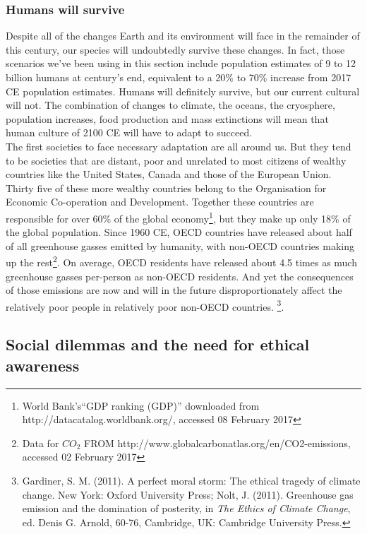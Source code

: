 \subsubsection{Humans will survive}
Despite all of the changes Earth and its environment will face in the remainder of this century, our species will undoubtedly survive these changes. In fact, those scenarios we've been using in this section include population estimates of 9 to 12 billion humans at century's end, equivalent to a 20\% to 70\% increase from 2017 CE population estimates. Humans will definitely survive, but our current cultural will not. The combination of changes to climate, the oceans, the cryosphere, population increases, food production and mass extinctions will mean that human culture of 2100 CE will have to adapt to succeed.\\

The first societies to face necessary adaptation are all around us. But they tend to be societies that are distant, poor and unrelated to most citizens of wealthy countries like the United States, Canada and those of the European Union. Thirty five of these more wealthy countries belong to the Organisation for Economic Co-operation and Development. Together these countries are responsible for over 60\% of the global economy\footnote{World Bank's``GDP ranking (GDP)'' downloaded from http://datacatalog.worldbank.org/, accessed 08 February 2017}, but they make up only 18\% of the global population. Since 1960 CE, OECD countries have released about half of all greenhouse gasses emitted by humanity, with non-OECD countries making up the rest\footnote{Data for $CO_2$ FROM http://www.globalcarbonatlas.org/en/CO2-emissions, accessed 02 February 2017}. On average, OECD residents have released about 4.5 times as much greenhouse gasses per-person as non-OECD residents. And yet the consequences of those emissions are now and will in the future disproportionately affect the relatively poor people in relatively poor non-OECD countries. \footnote{Gardiner, S. M. (2011). A perfect moral storm: The ethical tragedy of climate change. New York: Oxford University Press; Nolt, J. (2011). Greenhouse gas emission and the domination of posterity, in \textit{The Ethics of Climate Change}, ed. Denis G. Arnold, 60-76, Cambridge, UK: Cambridge University Press.}. \\

\subsection{Social dilemmas and the need for ethical awareness}
